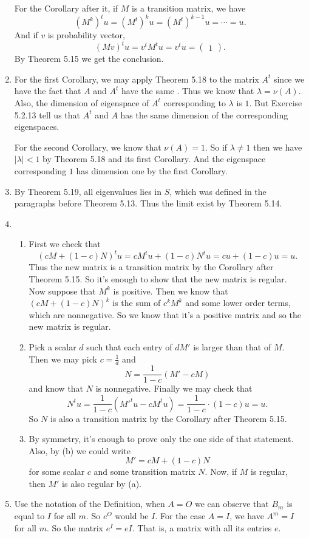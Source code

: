 \begin{enumerate}
For the Corollary after it, if $M$ is a transition matrix, we have 
\[(M^k)^tu=(M^t)^ku=(M^t)^{k-1}u=\cdots =u.\]
And if $v$ is probability vector, 
\[(Mv)^tu=v^tM^tu=v^tu=\begin{pmatrix}1\end{pmatrix}.\]
By Theorem 5.15 we get the conclusion.
\item For the first Corollary, we may apply Theorem 5.18 to the matrix $A^t$ since we have the fact that $A$ and $A^t$ have the same \charpoly{}. Thus we know that $\lambda =\nu(A)$. Also, the dimension of eigenspace of $A^t$ corresponding to $\lambda $ is $1$. But Exercise 5.2.13 tell us that $A^t$ and $A$ has the same dimension of the corresponding eigenspaces.

For the second Corollary, we know that $\nu(A)=1$. So if $\lambda \neq 1$ then we have $|\lambda|<1$ by Theorem 5.18 and its first Corollary. And the eigenspace corresponding $1$ has dimension one by the first Corollary.
\item By Theorem 5.19, all eigenvalues lies in $S$, which was defined in the paragraphs before Theorem 5.13. Thus the limit exist by Theorem 5.14.
\item \begin{enumerate}
\item First we check that 
\[(cM+(1-c)N)^tu=cM^tu+(1-c)N^tu=cu+(1-c)u=u.\] 
Thus the new matrix is a transition matrix by the Corollary after Theorem 5.15. So it's enough to show that the new matrix is regular. Now suppose that $M^k$ is positive. Then we know that $(cM+(1-c)N)^k$ is the sum of $c^kM^k$ and some lower order terms, which are nonnegative. So we know that it's a positive matrix and so the new matrix is regular.
\item Pick a scalar $d$ such that each entry of $dM'$ is larger than that of $M$. Then we may pick $c=\frac{1}{d}$ and 
\[N=\frac{1}{1-c}(M'-cM)\]
and know that $N$ is nonnegative. Finally we may check that 
\[N^tu=\frac{1}{1-c}(M'^tu-cM^tu)=\frac{1}{1-c}\cdot (1-c)u=u.\]
So $N$ is also a transition matrix by the Corollary after Theorem 5.15.
\item By symmetry, it's enough to prove only the one side of that statement. Also, by (b) we could write
\[M'=cM+(1-c)N\]
for some scalar $c$ and some transition matrix $N$. Now, if $M$ is regular, then $M'$ is also regular by (a).
\end{enumerate}
\item Use the notation of the Definition, when $A=O$ we can observe that $B_m$ is equal to $I$ for all $m$. So $e^O$ would be $I$. For the case $A=I$, we have $A^m=I$ for all $m$. So the matrix $e^I=eI$. That is, a matrix with all its entries $e$.

\end{enumerate}
